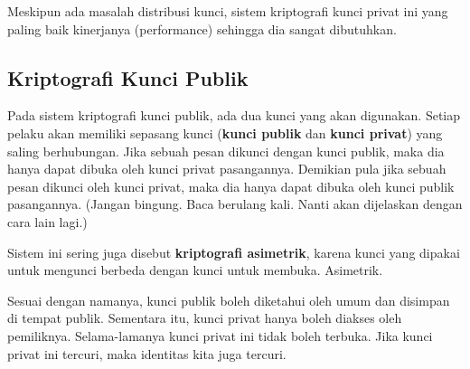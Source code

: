 Meskipun ada masalah distribusi kunci, sistem kriptografi kunci privat ini yang
paling baik kinerjanya (performance) sehingga dia sangat dibutuhkan.


\subsection{Kriptografi Kunci Publik}
Pada sistem kriptografi kunci publik, ada dua kunci yang akan digunakan. Setiap
pelaku akan memiliki sepasang kunci ({\bf kunci publik} dan {\bf kunci privat})
yang saling berhubungan. Jika sebuah pesan dikunci dengan kunci publik, maka
dia hanya dapat dibuka oleh kunci privat pasangannya. Demikian pula jika sebuah
pesan dikunci oleh kunci privat, maka dia hanya dapat dibuka oleh kunci publik
pasangannya. (Jangan bingung. Baca berulang kali. Nanti akan dijelaskan dengan
cara lain lagi.)

Sistem ini sering juga disebut {\bf kriptografi asimetrik}, karena kunci yang
dipakai untuk mengunci berbeda dengan kunci untuk membuka. Asimetrik.

Sesuai dengan namanya, kunci publik boleh diketahui oleh umum dan disimpan di
tempat publik. Sementara itu, kunci privat hanya boleh diakses oleh pemiliknya.
Selama-lamanya kunci privat ini tidak boleh terbuka. Jika kunci privat ini
tercuri, maka identitas kita juga tercuri.
